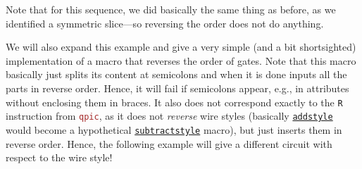 \documentclass{scrartcl}
\makeatletter
\newenvironment{codeexample*}{%
   \VerbatimEnvironment%
   \let\FVB@VerbatimOut\minted@FVB@VerbatimOut
   \let\FVE@VerbatimOut\minted@FVE@VerbatimOut
   \minted@configlang{tex}%
   \minted@fvset
   \begin{VerbatimOut}[codes={\catcode`\^^I=12},firstline,lastline]{\minted@jobname.pyg}%
}{
   \end{VerbatimOut}%
   \minted@langlinenoson%
   \begin{adjustbox}{center}
       \minted@jobname.pyg %
   \end{adjustbox}\nopagebreak
   \expandafter\minted@pygmentize\expandafter{\minted@lang}%
   \minted@langlinenosoff%
   \par%
}
\def\pkg#1{\textcolor{brown}{\texttt{#1}}}
\def\gate#1{\hyperref[gate:#1]{\texttt{#1}}}
\makeatother
\begin{document}
            \begin{example}
               \begin{codeexample*}
               \end{codeexample*}
               Note that for this sequence, we did basically the same thing as before, as we identified a symmetric slice---so reversing the order does not do anything.

               We will also expand this example and give a very simple (and a bit shortsighted) implementation of a macro that reverses the order of gates.
               Note that this macro basically just splits its content at semicolons and when it is done inputs all the parts in reverse order.
               Hence, it will fail if semicolons appear, e.g., in attributes without enclosing them in braces.
               It also does not correspond exactly to the \texttt{R} instruction from \pkg{qpic}, as it does not \emph{reverse} wire styles (basically \gate{addstyle} would become a hypothetical \gate{subtractstyle} macro), but just inserts them in reverse order.
               Hence, the following example will give a different circuit with respect to the wire style!


\end{example}
\end{document}
